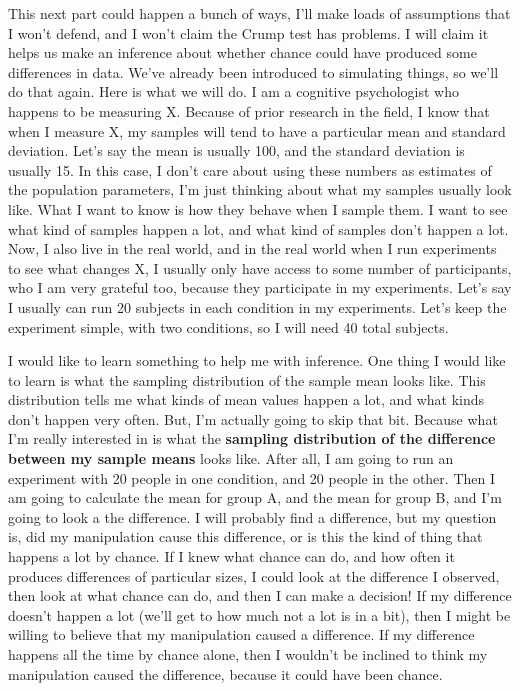 \documentclass[
]{book}
\begin{document}
This next part could happen a bunch of ways, I'll make loads of assumptions that I won't defend, and I won't claim the Crump test has problems. I will claim it helps us make an inference about whether chance could have produced some differences in data. We've already been introduced to simulating things, so we'll do that again. Here is what we will do. I am a cognitive psychologist who happens to be measuring X. Because of prior research in the field, I know that when I measure X, my samples will tend to have a particular mean and standard deviation. Let's say the mean is usually 100, and the standard deviation is usually 15. In this case, I don't care about using these numbers as estimates of the population parameters, I'm just thinking about what my samples usually look like. What I want to know is how they behave when I sample them. I want to see what kind of samples happen a lot, and what kind of samples don't happen a lot. Now, I also live in the real world, and in the real world when I run experiments to see what changes X, I usually only have access to some number of participants, who I am very grateful too, because they participate in my experiments. Let's say I usually can run 20 subjects in each condition in my experiments. Let's keep the experiment simple, with two conditions, so I will need 40 total subjects.

I would like to learn something to help me with inference. One thing I would like to learn is what the sampling distribution of the sample mean looks like. This distribution tells me what kinds of mean values happen a lot, and what kinds don't happen very often. But, I'm actually going to skip that bit. Because what I'm really interested in is what the \textbf{sampling distribution of the difference between my sample means} looks like. After all, I am going to run an experiment with 20 people in one condition, and 20 people in the other. Then I am going to calculate the mean for group A, and the mean for group B, and I'm going to look a the difference. I will probably find a difference, but my question is, did my manipulation cause this difference, or is this the kind of thing that happens a lot by chance. If I knew what chance can do, and how often it produces differences of particular sizes, I could look at the difference I observed, then look at what chance can do, and then I can make a decision! If my difference doesn't happen a lot (we'll get to how much not a lot is in a bit), then I might be willing to believe that my manipulation caused a difference. If my difference happens all the time by chance alone, then I wouldn't be inclined to think my manipulation caused the difference, because it could have been chance.
\end{document}
